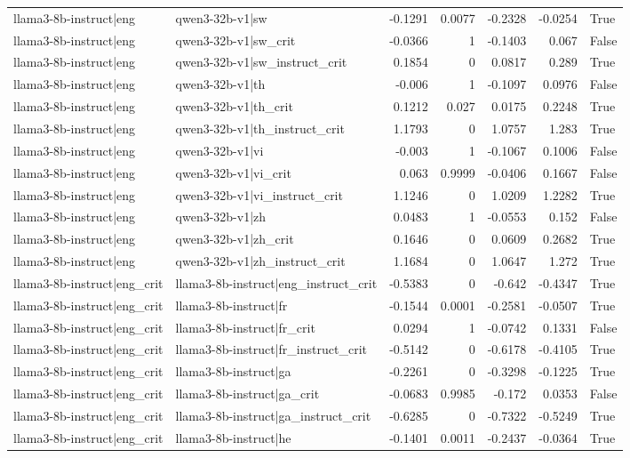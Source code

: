 \begin{table}
\begin{tabular}{l l r r r r l}
llama3-8b-instruct|eng & qwen3-32b-v1|sw & -0.1291 & 0.0077 & -0.2328 & -0.0254 & True \\
llama3-8b-instruct|eng & qwen3-32b-v1|sw_crit & -0.0366 & 1 & -0.1403 & 0.067 & False \\
llama3-8b-instruct|eng & qwen3-32b-v1|sw_instruct_crit & 0.1854 & 0 & 0.0817 & 0.289 & True \\
llama3-8b-instruct|eng & qwen3-32b-v1|th & -0.006 & 1 & -0.1097 & 0.0976 & False \\
llama3-8b-instruct|eng & qwen3-32b-v1|th_crit & 0.1212 & 0.027 & 0.0175 & 0.2248 & True \\
llama3-8b-instruct|eng & qwen3-32b-v1|th_instruct_crit & 1.1793 & 0 & 1.0757 & 1.283 & True \\
llama3-8b-instruct|eng & qwen3-32b-v1|vi & -0.003 & 1 & -0.1067 & 0.1006 & False \\
llama3-8b-instruct|eng & qwen3-32b-v1|vi_crit & 0.063 & 0.9999 & -0.0406 & 0.1667 & False \\
llama3-8b-instruct|eng & qwen3-32b-v1|vi_instruct_crit & 1.1246 & 0 & 1.0209 & 1.2282 & True \\
llama3-8b-instruct|eng & qwen3-32b-v1|zh & 0.0483 & 1 & -0.0553 & 0.152 & False \\
llama3-8b-instruct|eng & qwen3-32b-v1|zh_crit & 0.1646 & 0 & 0.0609 & 0.2682 & True \\
llama3-8b-instruct|eng & qwen3-32b-v1|zh_instruct_crit & 1.1684 & 0 & 1.0647 & 1.272 & True \\
llama3-8b-instruct|eng_crit & llama3-8b-instruct|eng_instruct_crit & -0.5383 & 0 & -0.642 & -0.4347 & True \\
llama3-8b-instruct|eng_crit & llama3-8b-instruct|fr & -0.1544 & 0.0001 & -0.2581 & -0.0507 & True \\
llama3-8b-instruct|eng_crit & llama3-8b-instruct|fr_crit & 0.0294 & 1 & -0.0742 & 0.1331 & False \\
llama3-8b-instruct|eng_crit & llama3-8b-instruct|fr_instruct_crit & -0.5142 & 0 & -0.6178 & -0.4105 & True \\
llama3-8b-instruct|eng_crit & llama3-8b-instruct|ga & -0.2261 & 0 & -0.3298 & -0.1225 & True \\
llama3-8b-instruct|eng_crit & llama3-8b-instruct|ga_crit & -0.0683 & 0.9985 & -0.172 & 0.0353 & False \\
llama3-8b-instruct|eng_crit & llama3-8b-instruct|ga_instruct_crit & -0.6285 & 0 & -0.7322 & -0.5249 & True \\
llama3-8b-instruct|eng_crit & llama3-8b-instruct|he & -0.1401 & 0.0011 & -0.2437 & -0.0364 & True \\

\end{tabular}
\end{table}
